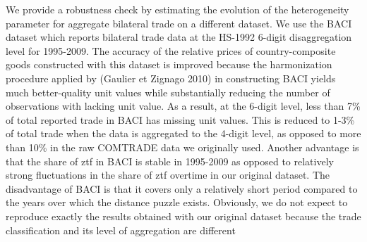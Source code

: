 \documentclass[12pt,twoside,a4paper,notitlepage]{article}
\begin{document}
{We provide a robustness check by estimating the evolution of the heterogeneity parameter for aggregate bilateral trade on a different dataset. We use the BACI dataset which reports bilateral trade data at the HS-1992 6-digit disaggregation level for 1995-2009. The accuracy of the relative prices of country-composite goods constructed with this dataset is improved because the harmonization procedure applied by (Gaulier et Zignago 2010) in constructing BACI yields much better-quality unit values while substantially reducing the number of observations with lacking unit value. As a result, at the 6-digit level, less than 7\% of total reported trade in BACI has missing unit values. This is reduced to 1-3\% of total trade when the data is aggregated to the 4-digit level, as opposed to more than 10\% in the raw COMTRADE data we originally used. Another advantage is that the share of ztf in BACI is stable in 1995-2009 as opposed to relatively strong fluctuations in the share of ztf overtime in our original dataset. The disadvantage of BACI is that it covers only a relatively short period compared to the years over which the distance puzzle exists. Obviously, we do not expect to reproduce exactly the results obtained with our original dataset because the trade classification and its level of aggregation are different

}
\end{document}
